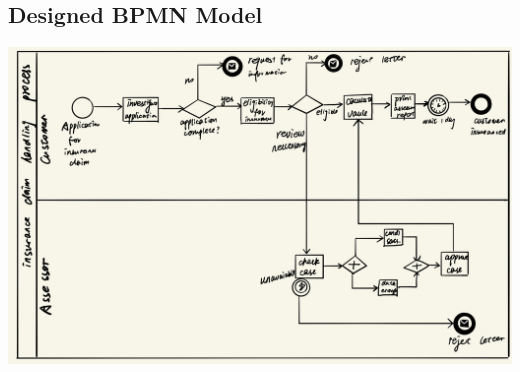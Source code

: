 \documentclass[runningheads]{llncs}
\begin{document}
\subsection{Designed BPMN Model}
\includegraphics[scale=0.3]{BPMN.jpeg}
\end{document}
